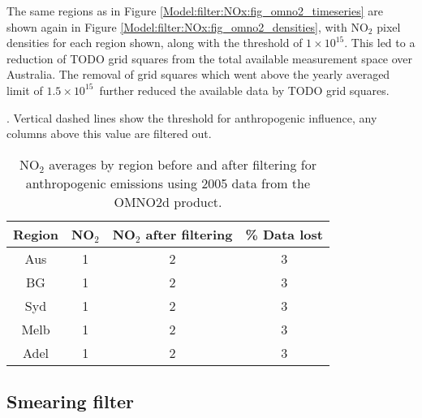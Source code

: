     The same regions as in Figure \ref{Model:filter:NOx:fig_omno2_timeseries} are shown again in Figure \ref{Model:filter:NOx:fig_omno2_densities}, with NO$_2$ pixel densities for each region shown, along with the threshold of $1 \times 10^{15}$\moleccm.
    This led to a reduction of TODO grid squares from the total available measurement space over Australia.
    The removal of grid squares which went above the yearly averaged limit of $1.5 \times 10^{15}$\moleccm ~further reduced the available data by TODO grid squares.
    
    .
      Vertical dashed lines show the threshold for anthropogenic influence, any columns above this value are filtered out.
    {\label{Model:filter:NOx:fig_omno2_densities}}
    
    
    \begin{table}
      \caption{NO$_2$ averages by region before and after filtering for anthropogenic emissions using 2005 data from the OMNO2d product.}
      \begin{tabular}{ c c c c }
        \hline
        \textbf{Region} & \textbf{NO$_2$} & \textbf{NO$_2$ after filtering} & \textbf{\% Data lost} 
        \\ \hline
        Aus & 1 & 2 & 3 \\
        BG & 1 & 2 & 3 \\
        Syd & 1 & 2 & 3 \\
        Melb & 1 & 2 & 3 \\
        Adel & 1 & 2 & 3 \\
        \hline
      \end{tabular}
      \label{Model:filter:NOx:tab_summary}
    \end{table}
    
  
  \subsection{Smearing filter}
    \label{Model:filter:smearing}
    
